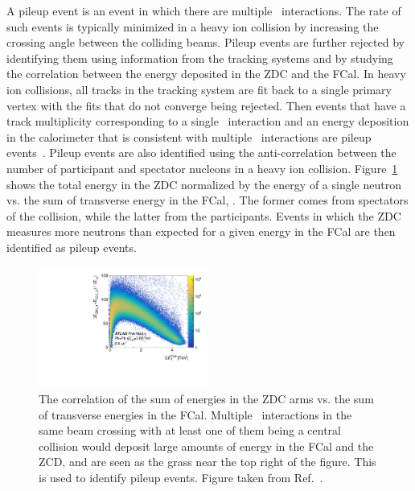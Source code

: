 
A pileup event is an event in which there are multiple \pbpb\ interactions.
The rate of such events is typically minimized in a heavy ion collision by increasing the crossing angle between the colliding beams.
Pileup events are further rejected by identifying them using information from the tracking systems and by studying the correlation between the energy deposited in the ZDC and the FCal.
In heavy ion collisions, all tracks in the tracking system are fit back to a single primary vertex with the fits that do not converge being rejected.
Then events that have a track multiplicity corresponding to a single \pbpb\ interaction and an energy deposition in the calorimeter that is consistent with multiple \pbpb\ interactions are pileup events~\cite{Aad2014}.
Pileup events are also identified using the anti-correlation between the number of participant and spectator nucleons in a heavy ion collision.
Figure~\ref{fig:zdc_fcal} shows the total energy in the ZDC normalized by the energy of a single neutron vs. the sum of transverse energy in the FCal, \ETfcal.
The former comes from spectators of the collision, while the latter from the participants.
Events in which the ZDC measures more neutrons than expected for a given energy in the FCal are then identified as pileup events.

\begin{figure}[ht]
	\centering
        \includegraphics[width=0.5\textwidth]{figures/setup/zdc_fcal}
          \caption{The correlation of the sum of energies in the ZDC arms vs. the sum of transverse energies in the FCal.
          Multiple \pbpb\ interactions in the same beam crossing with at least one of them being a central collision would deposit large amounts of energy in the FCal and the ZCD, and are seen as the grass near the top right of the figure.
          This is used to identify pileup events.
           Figure taken from Ref.~\cite{perfPlots}.}
          \label{fig:zdc_fcal}
\end{figure}


